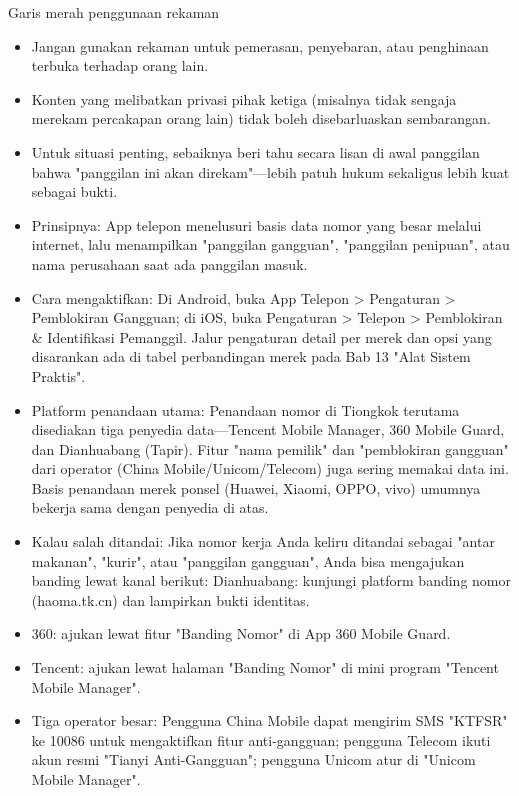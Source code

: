 \begin{tcbwarn}{Garis merah penggunaan rekaman}
\begin{itemize}
  \item Jangan gunakan rekaman untuk pemerasan, penyebaran, atau penghinaan terbuka terhadap orang lain.
  \item Konten yang melibatkan privasi pihak ketiga (misalnya tidak sengaja merekam percakapan orang lain) tidak boleh disebarluaskan sembarangan.
  \item Untuk situasi penting, sebaiknya beri tahu secara lisan di awal panggilan bahwa "panggilan ini akan direkam"—lebih patuh hukum sekaligus lebih kuat sebagai bukti.
\end{itemize}

\end{tcbwarn}


\begin{itemize}
  \item Prinsipnya: App telepon menelusuri basis data nomor yang besar melalui internet, lalu menampilkan "panggilan gangguan", "panggilan penipuan", atau nama perusahaan saat ada panggilan masuk.
  \item Cara mengaktifkan: Di Android, buka App Telepon > Pengaturan > Pemblokiran Gangguan; di iOS, buka Pengaturan > Telepon > Pemblokiran \& Identifikasi Pemanggil. Jalur pengaturan detail per merek dan opsi yang disarankan ada di tabel perbandingan merek pada Bab 13 "Alat Sistem Praktis".
  \item Platform penandaan utama: Penandaan nomor di Tiongkok terutama disediakan tiga penyedia data—Tencent Mobile Manager, 360 Mobile Guard, dan Dianhuabang (Tapir). Fitur "nama pemilik" dan "pemblokiran gangguan" dari operator (China Mobile/Unicom/Telecom) juga sering memakai data ini. Basis penandaan merek ponsel (Huawei, Xiaomi, OPPO, vivo) umumnya bekerja sama dengan penyedia di atas.
  \item Kalau salah ditandai: Jika nomor kerja Anda keliru ditandai sebagai "antar makanan", "kurir", atau "panggilan gangguan", Anda bisa mengajukan banding lewat kanal berikut: Dianhuabang: kunjungi platform banding nomor (haoma.tk.cn) dan lampirkan bukti identitas.
  \item 360: ajukan lewat fitur "Banding Nomor" di App 360 Mobile Guard.
  \item Tencent: ajukan lewat halaman "Banding Nomor" di mini program "Tencent Mobile Manager".
  \item Tiga operator besar: Pengguna China Mobile dapat mengirim SMS "KTFSR" ke 10086 untuk mengaktifkan fitur anti-gangguan; pengguna Telecom ikuti akun resmi "Tianyi Anti-Gangguan"; pengguna Unicom atur di "Unicom Mobile Manager".
\end{itemize}

